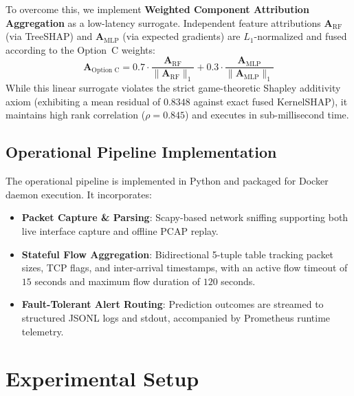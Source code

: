 \documentclass[10pt,journal,compsoc,twocolumn]{IEEEtran}
\begin{document}
To overcome this, we implement \textbf{Weighted Component Attribution Aggregation} as a low-latency surrogate. Independent feature attributions $\mathbf{A}_{\text{RF}}$ (via TreeSHAP) and $\mathbf{A}_{\text{MLP}}$ (via expected gradients) are $L_1$-normalized and fused according to the Option~C weights:
\begin{equation}
\mathbf{A}_{\text{Option C}} = 0.7 \cdot \frac{\mathbf{A}_{\text{RF}}}{\|\mathbf{A}_{\text{RF}}\|_1} + 0.3 \cdot \frac{\mathbf{A}_{\text{MLP}}}{\|\mathbf{A}_{\text{MLP}}\|_1}
\label{eq:xai_surrogate}
\end{equation}
While this linear surrogate violates the strict game-theoretic Shapley additivity axiom (exhibiting a mean residual of $0.8348$ against exact fused KernelSHAP), it maintains high rank correlation ($\rho = 0.845$) and executes in sub-millisecond time.

\subsection{Operational Pipeline Implementation}
The operational pipeline is implemented in Python and packaged for Docker daemon execution. It incorporates:
\begin{itemize}
    \item \textbf{Packet Capture \& Parsing}: Scapy-based network sniffing supporting both live interface capture and offline PCAP replay.
    \item \textbf{Stateful Flow Aggregation}: Bidirectional 5-tuple table tracking packet sizes, TCP flags, and inter-arrival timestamps, with an active flow timeout of $15$ seconds and maximum flow duration of $120$ seconds.
    \item \textbf{Fault-Tolerant Alert Routing}: Prediction outcomes are streamed to structured JSONL logs and stdout, accompanied by Prometheus runtime telemetry.
\end{itemize}

\section{Experimental Setup}
\end{document}
